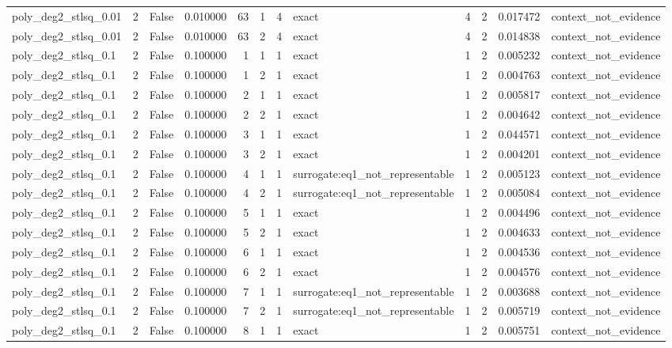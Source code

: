 \begin{tabular}{lrrrrrrlrrrl}
poly\_deg2\_stlsq\_0.01 & 2 & False & 0.010000 & 63 & 1 & 4 & exact & 4 & 2 & 0.017472 & context\_not\_evidence \\
poly\_deg2\_stlsq\_0.01 & 2 & False & 0.010000 & 63 & 2 & 4 & exact & 4 & 2 & 0.014838 & context\_not\_evidence \\
poly\_deg2\_stlsq\_0.1 & 2 & False & 0.100000 & 1 & 1 & 1 & exact & 1 & 2 & 0.005232 & context\_not\_evidence \\
poly\_deg2\_stlsq\_0.1 & 2 & False & 0.100000 & 1 & 2 & 1 & exact & 1 & 2 & 0.004763 & context\_not\_evidence \\
poly\_deg2\_stlsq\_0.1 & 2 & False & 0.100000 & 2 & 1 & 1 & exact & 1 & 2 & 0.005817 & context\_not\_evidence \\
poly\_deg2\_stlsq\_0.1 & 2 & False & 0.100000 & 2 & 2 & 1 & exact & 1 & 2 & 0.004642 & context\_not\_evidence \\
poly\_deg2\_stlsq\_0.1 & 2 & False & 0.100000 & 3 & 1 & 1 & exact & 1 & 2 & 0.044571 & context\_not\_evidence \\
poly\_deg2\_stlsq\_0.1 & 2 & False & 0.100000 & 3 & 2 & 1 & exact & 1 & 2 & 0.004201 & context\_not\_evidence \\
poly\_deg2\_stlsq\_0.1 & 2 & False & 0.100000 & 4 & 1 & 1 & surrogate:eq1\_not\_representable & 1 & 2 & 0.005123 & context\_not\_evidence \\
poly\_deg2\_stlsq\_0.1 & 2 & False & 0.100000 & 4 & 2 & 1 & surrogate:eq1\_not\_representable & 1 & 2 & 0.005084 & context\_not\_evidence \\
poly\_deg2\_stlsq\_0.1 & 2 & False & 0.100000 & 5 & 1 & 1 & exact & 1 & 2 & 0.004496 & context\_not\_evidence \\
poly\_deg2\_stlsq\_0.1 & 2 & False & 0.100000 & 5 & 2 & 1 & exact & 1 & 2 & 0.004633 & context\_not\_evidence \\
poly\_deg2\_stlsq\_0.1 & 2 & False & 0.100000 & 6 & 1 & 1 & exact & 1 & 2 & 0.004536 & context\_not\_evidence \\
poly\_deg2\_stlsq\_0.1 & 2 & False & 0.100000 & 6 & 2 & 1 & exact & 1 & 2 & 0.004576 & context\_not\_evidence \\
poly\_deg2\_stlsq\_0.1 & 2 & False & 0.100000 & 7 & 1 & 1 & surrogate:eq1\_not\_representable & 1 & 2 & 0.003688 & context\_not\_evidence \\
poly\_deg2\_stlsq\_0.1 & 2 & False & 0.100000 & 7 & 2 & 1 & surrogate:eq1\_not\_representable & 1 & 2 & 0.005719 & context\_not\_evidence \\
poly\_deg2\_stlsq\_0.1 & 2 & False & 0.100000 & 8 & 1 & 1 & exact & 1 & 2 & 0.005751 & context\_not\_evidence \\

\end{tabular}
